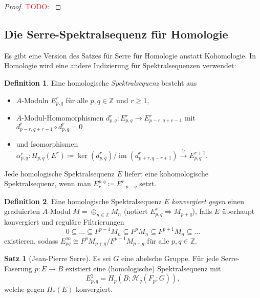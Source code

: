 \documentclass[11pt, a4paper, german]{article}
\theoremstyle{definition}
\newtheorem{satz}{Satz}
\newtheorem{defn}{Definition}
\theoremstyle{remark}
\newcommand{\TODO}[1]{\textcolor{red}{TODO: #1}} %
\newcommand{\Z}{\mathbb{Z}} %
\DeclareMathOperator{\im}{im} %
\newcommand{\LH}{\mathcal{H}} %
\begin{document}
\begin{proof}
  \TODO{}
\end{proof}


\subsection{Die Serre-Spektralsequenz für Homologie}

Es gibt eine Version des Satzes für Serre für Homologie anstatt Kohomologie.
In Homologie wird eine andere Indizierung für Spektralsequenzen verwendet:

\begin{defn}
  Eine homologische \emph{Spektralsequenz} besteht aus
  \begin{itemize}
    \item $A$-Moduln $E^r_{p,q}$ für alle $p, q \in \Z$ und $r \geq 1$,
    \item $A$-Modul-Homomorphismen $d^r_{p,q} : E^r_{p,q} \to E^r_{p-r,q+r-1}$ mit $d^r_{p-r,q+r-1} \circ d^r_{p,q} = 0$
    \item und Isomorphismen $\alpha^r_{p,q} : H_{p,q}(E^r) \!\coloneqq\! \ker(d ^r_{p,q}) / \im(d^r_{p+r,q-r+1}) \xrightarrow{\cong} E^{r+1}_{p,q}$.
  \end{itemize}
\end{defn}

Jede homologische Spektralsequenz $E$ liefert eine kohomologische Spektralsequenz, wenn man $E_r^{p,q} \coloneqq E^r_{-p,-q}$ setzt.

\begin{defn}
  Eine homologische Spektralsequenz $E$ \emph{konvergiert gegen} einen graduierten $A$-Modul $M = \oplus_{n \in \Z} M_n$ (notiert $E^r_{p,q} \Rightarrow M_{p+q}$), falls $E$ überhaupt konvergiert und reguläre Filtrierungen
  \[ 0 \subseteq \ldots \subseteq F^{p-1} M_n \subseteq F^p M_n \subseteq F^{p+1} M_n \subseteq \ldots \]
  existieren, sodass $E^\infty_{pq} \cong F^p M_{p+q} / F^{p-1} M_{p+q}$ für alle $p, q \in \Z$.
\end{defn}

\begin{satz}[Jean-Pierre Serre]
  Es sei $G$ eine abelsche Gruppe.
  Für jede Serre-Faserung $p : E \to B$ existiert eine (homologische) Spektralsequenz mit
  \[ E^2_{p,q} = H_p(B; \LH_q(F_p; G)), \]
  welche gegen $H_*(E)$ konvergiert.
\end{satz}
\end{document}
